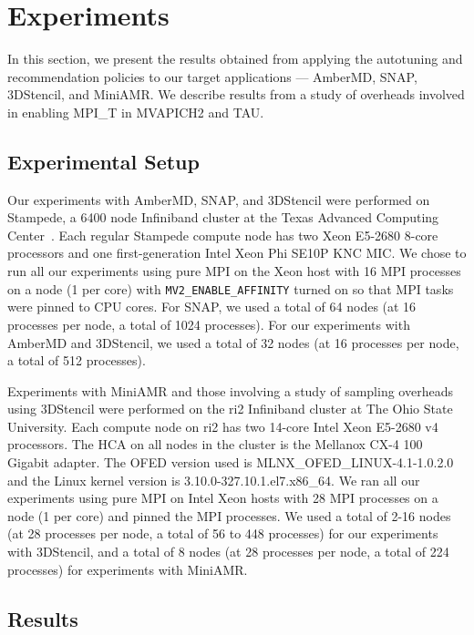 \section{Experiments}
In this section, we present the results obtained from applying the autotuning and recommendation policies to our target applications --- AmberMD, SNAP, 3DStencil, and MiniAMR. We describe results from a study of overheads involved in enabling MPI\_T in MVAPICH2 and TAU.

\subsection{Experimental Setup}
Our experiments with AmberMD, SNAP, and 3DStencil were performed on Stampede, a 6400 node Infiniband cluster at the Texas Advanced Computing Center~\cite{TACC}. Each regular Stampede compute node has two Xeon E5-2680 8-core  processors and one first-generation Intel Xeon Phi SE10P KNC MIC. We chose to run all our experiments using pure MPI on the Xeon host with 16 MPI processes on a node (1 per core) with \verb+MV2_ENABLE_AFFINITY+ turned on so that MPI tasks were pinned to CPU cores. For SNAP, we used a total of 64 nodes (at 16 processes per node, a total of 1024 processes). For our experiments with AmberMD and 3DStencil, we used a total of 32 nodes (at 16 processes per node, a total of 512 processes). \par
Experiments with MiniAMR and those involving a study of sampling overheads using 3DStencil were performed on the ri2 Infiniband cluster at The Ohio State University. Each compute node on ri2 has two 14-core Intel Xeon E5-2680 v4 processors. The HCA on all nodes in the cluster is the Mellanox CX-4 100 Gigabit adapter. The OFED version used is MLNX\_OFED\_LINUX-4.1-1.0.2.0 and the Linux kernel version is 3.10.0-327.10.1.el7.x86\_64. We ran all our experiments using pure MPI on Intel Xeon hosts with 28 MPI processes on a node (1 per core) and pinned the MPI processes. We used a total of 2-16 nodes (at 28 processes per node, a total of 56 to 448 processes) for our experiments with 3DStencil, and a total of 8 nodes (at 28 processes per node, a total of 224 processes) for experiments with MiniAMR.

\subsection{Results}

